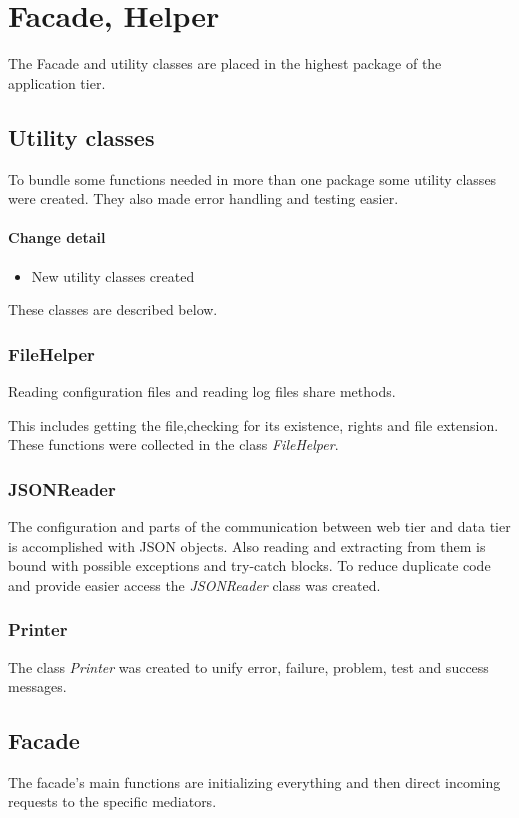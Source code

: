 \section{Facade, Helper}
The Facade and utility classes are placed in the highest package of the application tier.

\subsection{Utility classes}\label{utility}
To bundle some functions needed in more than one package some utility
classes were created. They also made error handling and 
testing easier.

\paragraph{Change detail}
\begin{itemize}
  \item New utility classes created
\end{itemize}

These classes are described below.

\subsubsection{FileHelper}
Reading configuration files and reading log files share methods.

This includes getting the file,checking for its existence,
rights and file extension. These functions
were collected in the class \textit{FileHelper}.


\subsubsection{JSONReader}\label{reader}
The configuration and parts of the communication between web tier
and data tier is accomplished with JSON objects. Also reading and
extracting from them is bound with possible exceptions and try-catch blocks.
To reduce duplicate code and provide easier access the \textit{JSONReader} class
was created.

\subsubsection{Printer}
The class \textit{Printer} was created to unify error, failure, problem, test
and success messages.


\subsection{Facade}
The facade's main functions are initializing everything and then direct incoming requests to
the specific mediators.


